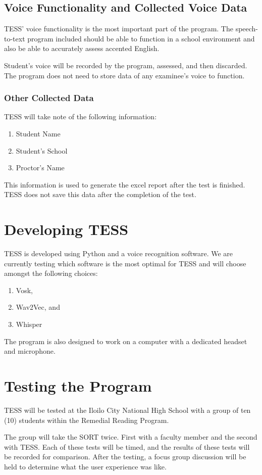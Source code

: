 \subsection{Voice Functionality and Collected Voice Data}
TESS’ voice functionality is the most important part of the program. The speech-to-text program included should be able to function in a school environment and also be able to accurately assess accented English.

Student’s voice will be recorded by the program, assessed, and then discarded. The program does not need to store data of any examinee’s voice to function.

\subsubsection{Other Collected Data}
TESS will take note of the following information:
\begin{enumerate}
\item Student Name
\item Student’s School
\item Proctor’s Name
\end{enumerate}
This information is used to generate the excel report after the test is finished. TESS does not save this data after the completion of the test.

\section{Developing TESS}
TESS is developed using Python and a voice recognition software. We are currently testing which software is the most optimal for TESS and will choose amongst the following choices:
\begin{enumerate}
\item Vosk,
\item Wav2Vec, and
\item Whisper
\end{enumerate}

The program is also designed to work on a computer with a dedicated headset and microphone.

\section{Testing the Program}
TESS will be tested at the Iloilo City National High School with a group of ten (10) students within the Remedial Reading Program.

The group will take the SORT twice. First with a faculty member and the second with TESS. Each of these tests will be timed, and the results of these tests will be recorded for comparison.
After the testing, a focus group discussion will be held to determine what the user experience was like.


